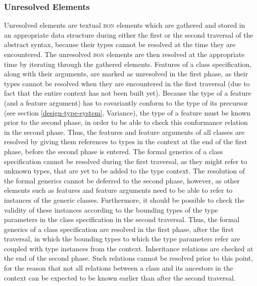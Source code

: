 \subsubsection{Unresolved Elements}
\label{implementation-unresolved-elements}
\label{implementation-unresolved-elements}
Unresolved elements are textual \textsc{bon} elements which are gathered and stored in an appropriate data structure during either the first or the second traversal of the abstract syntax, because their types cannot be resolved at the time they are encountered. The unresolved \textsc{bon} elements are then resolved at the appropriate time by iterating through the gathered elements.
Features of a class specification, along with their arguments, are marked as unresolved in the first phase, as their types cannot be resolved when they are encountered in the first traversal (due to fact that the entire context has not been built yet). Because the type of a feature (and a feature argument) has to covariantly conform to the type of its precursor (see section \ref{design-type-system}, Variance), the type of a feature must be known prior to the second phase, in order to be able to check this conformance relation in the second phase. Thus, the features and feature arguments of all classes are resolved by giving them references to types in the context at the end of the first phase, before the second phase is entered.
The formal generics 	of a class specification cannot be resolved during the first traversal, as they might refer to unknown types, that are yet to be added to the type context. The resolution of the formal generics cannot be deferred to the second phase, however, as other elements such as features and feature arguments need to be able to refer to instances of the generic classes. Furthermore, it should be possible to check the validity of these instances according to the bounding types of the type parameters in the class specification in the second traversal. Thus, the formal generics of a class specification are resolved in the first phase, after the first traversal, in which the bounding types to which the type parameters refer are coupled with type instances from the context.
Inheritance relations are checked at the end of the second phase. Such relations cannot be resolved prior to this point, for the reason that not all relations between a class and its ancestors in the context can be expected to be known earlier than after the second traversal.
